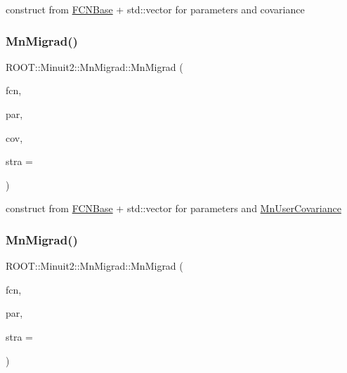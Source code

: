 construct from \mbox{\hyperlink{classROOT_1_1Minuit2_1_1FCNBase}{F\+C\+N\+Base}} + std\+::vector for parameters and covariance 

\mbox{\label{classROOT_1_1Minuit2_1_1MnMigrad_a7830eb76c9d314bc8e101ac34150ccb8}} 
\subsubsection{\texorpdfstring{MnMigrad()}{MnMigrad()}\hspace{0.1cm}{\footnotesize\ttfamily [3/39]}}
{\footnotesize\ttfamily R\+O\+O\+T\+::\+Minuit2\+::\+Mn\+Migrad\+::\+Mn\+Migrad (\begin{DoxyParamCaption}\item[{const \mbox{\hyperlink{classROOT_1_1Minuit2_1_1FCNBase}{F\+C\+N\+Base}} \&}]{fcn,  }\item[{const std\+::vector$<$ double $>$ \&}]{par,  }\item[{const \mbox{\hyperlink{classROOT_1_1Minuit2_1_1MnUserCovariance}{Mn\+User\+Covariance}} \&}]{cov,  }\item[{unsigned int}]{stra = {} }\end{DoxyParamCaption})\hspace{0.3cm}{\ttfamily [inline]}}



construct from \mbox{\hyperlink{classROOT_1_1Minuit2_1_1FCNBase}{F\+C\+N\+Base}} + std\+::vector for parameters and \mbox{\hyperlink{classROOT_1_1Minuit2_1_1MnUserCovariance}{Mn\+User\+Covariance}} 

\mbox{\label{classROOT_1_1Minuit2_1_1MnMigrad_a552ce72a98922a75ef921a3cccfe97c1}} 
\subsubsection{\texorpdfstring{MnMigrad()}{MnMigrad()}\hspace{0.1cm}{\footnotesize\ttfamily [4/39]}}
{\footnotesize\ttfamily R\+O\+O\+T\+::\+Minuit2\+::\+Mn\+Migrad\+::\+Mn\+Migrad (\begin{DoxyParamCaption}\item[{const \mbox{\hyperlink{classROOT_1_1Minuit2_1_1FCNBase}{F\+C\+N\+Base}} \&}]{fcn,  }\item[{const \mbox{\hyperlink{classROOT_1_1Minuit2_1_1MnUserParameters}{Mn\+User\+Parameters}} \&}]{par,  }\item[{unsigned int}]{stra = {} }\end{DoxyParamCaption})\hspace{0.3cm}{\ttfamily [inline]}}



